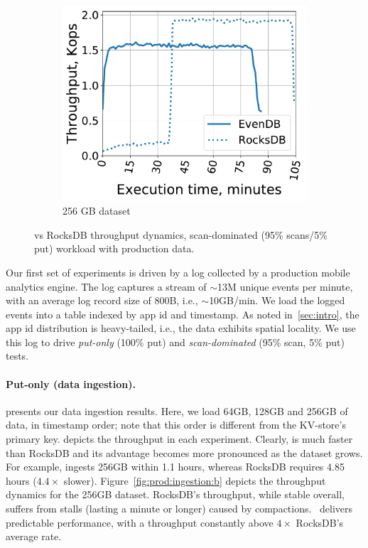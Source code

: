 \begin{figure}[tb]
\begin{subfigure}{0.29\linewidth}
\includegraphics[width=\textwidth]{figs/throughput_256_scans_10s_line.pdf}
\caption{256 GB dataset}
\label{fig:prod:analytics:c}
\end{subfigure}
\caption{\sys\/ vs RocksDB throughput dynamics,  scan-dominated (95\% scans/5\% put) workload with production data.}
\label{fig:prod:analytics}
\end{figure}

Our first set of experiments is driven by a log collected by a production mobile analytics engine. The log captures 
a stream  of $\sim$13M unique events per minute, with an average log record size of 800B, i.e., $\sim$10GB/min. 
We load the logged events into a table indexed by app id and timestamp. 
As noted in~\cref{sec:intro}, the app id distribution is heavy-tailed, i.e., the data exhibits spatial locality. 
We use this log to drive \emph{put-only} (100\% put) and \emph{scan-dominated} 
(95\% scan, 5\% put) tests.

\paragraph{Put-only (data ingestion).} 
 presents our  data ingestion results. 
Here, we load 64GB, 128GB and 256GB of data, in timestamp order; note that this order is different from the KV-store's primary key. 
  depicts the throughput in each experiment. Clearly, \sys\/ is much faster than RocksDB and its advantage 
becomes more pronounced as the dataset grows. For example, \sys\/ ingests 256GB  within 1.1 hours, 
whereas RocksDB requires 4.85 hours ($4.4\times$ slower). Figure~\ref{fig:prod:ingestion:b} depicts the  
throughput dynamics for the 256GB dataset. RocksDB's throughput, while stable overall, suffers from stalls 
(lasting a minute or longer) caused by compactions. 
\sys\ delivers predictable performance, with a throughput constantly above $4\times$ RocksDB's average rate.

